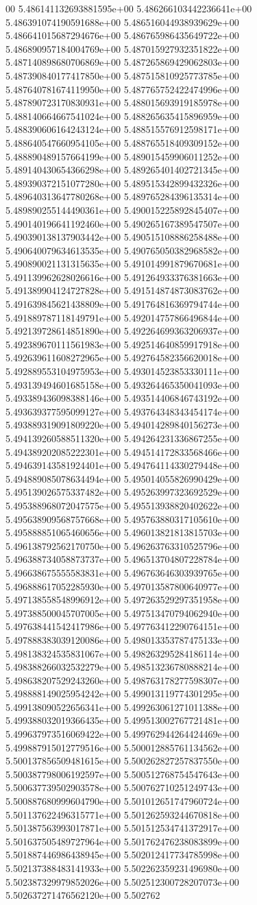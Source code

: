 00	5.486141132693881595e+00	5.486266103442236641e+00	5.486391074190591688e+00	5.486516044938939629e+00	5.486641015687294676e+00	5.486765986435649722e+00	5.486890957184004769e+00	5.487015927932351822e+00	5.487140898680706869e+00	5.487265869429062803e+00	5.487390840177417850e+00	5.487515810925773785e+00	5.487640781674119950e+00	5.487765752422474996e+00	5.487890723170830931e+00	5.488015693919185978e+00	5.488140664667541024e+00	5.488265635415896959e+00	5.488390606164243124e+00	5.488515576912598171e+00	5.488640547660954105e+00	5.488765518409309152e+00	5.488890489157664199e+00	5.489015459906011252e+00	5.489140430654366298e+00	5.489265401402721345e+00	5.489390372151077280e+00	5.489515342899432326e+00	5.489640313647780268e+00	5.489765284396135314e+00	5.489890255144490361e+00	5.490015225892845407e+00	5.490140196641192460e+00	5.490265167389547507e+00	5.490390138137903442e+00	5.490515108886258488e+00	5.490640079634613535e+00	5.490765050382968582e+00	5.490890021131315635e+00	5.491014991879670681e+00	5.491139962628026616e+00	5.491264933376381663e+00	5.491389904124727828e+00	5.491514874873083762e+00	5.491639845621438809e+00	5.491764816369794744e+00	5.491889787118149791e+00	5.492014757866496844e+00	5.492139728614851890e+00	5.492264699363206937e+00	5.492389670111561983e+00	5.492514640859917918e+00	5.492639611608272965e+00	5.492764582356620018e+00	5.492889553104975953e+00	5.493014523853330111e+00	5.493139494601685158e+00	5.493264465350041093e+00	5.493389436098388146e+00	5.493514406846743192e+00	5.493639377595099127e+00	5.493764348343454174e+00	5.493889319091809220e+00	5.494014289840156273e+00	5.494139260588511320e+00	5.494264231336867255e+00	5.494389202085222301e+00	5.494514172833568466e+00	5.494639143581924401e+00	5.494764114330279448e+00	5.494889085078634494e+00	5.495014055826990429e+00	5.495139026575337482e+00	5.495263997323692529e+00	5.495388968072047575e+00	5.495513938820402622e+00	5.495638909568757668e+00	5.495763880317105610e+00	5.495888851065460656e+00	5.496013821813815703e+00	5.496138792562170750e+00	5.496263763310525796e+00	5.496388734058873737e+00	5.496513704807228784e+00	5.496638675555583831e+00	5.496763646303939765e+00	5.496888617052285930e+00	5.497013587800640977e+00	5.497138558548996912e+00	5.497263529297351958e+00	5.497388500045707005e+00	5.497513470794062940e+00	5.497638441542417986e+00	5.497763412290764151e+00	5.497888383039120086e+00	5.498013353787475133e+00	5.498138324535831067e+00	5.498263295284186114e+00	5.498388266032532279e+00	5.498513236780888214e+00	5.498638207529243260e+00	5.498763178277598307e+00	5.498888149025954242e+00	5.499013119774301295e+00	5.499138090522656341e+00	5.499263061271011388e+00	5.499388032019366435e+00	5.499513002767721481e+00	5.499637973516069422e+00	5.499762944264424469e+00	5.499887915012779516e+00	5.500012885761134562e+00	5.500137856509481615e+00	5.500262827257837550e+00	5.500387798006192597e+00	5.500512768754547643e+00	5.500637739502903578e+00	5.500762710251249743e+00	5.500887680999604790e+00	5.501012651747960724e+00	5.501137622496315771e+00	5.501262593244670818e+00	5.501387563993017871e+00	5.501512534741372917e+00	5.501637505489727964e+00	5.501762476238083899e+00	5.501887446986438945e+00	5.502012417734785998e+00	5.502137388483141933e+00	5.502262359231496980e+00	5.502387329979852026e+00	5.502512300728207073e+00	5.502637271476562120e+00	5.502762